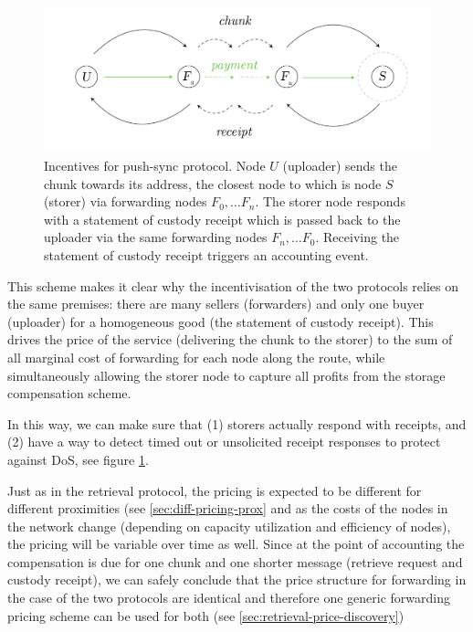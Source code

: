 \begin{figure}[htbp]
\centering
\includegraphics[width=\textwidth]{fig/push-payment.pdf}
\caption[Incentives for push-sync protocol \statusgreen]{Incentives for push-sync protocol. Node $U$ (uploader) sends the chunk towards its address, the closest node to which is node $S$ (storer) via forwarding nodes $F_0, \ldots F_n$. The storer node responds with a statement of custody receipt which is passed back to the uploader via the same forwarding nodes $F_n, \ldots F_0$. Receiving the statement of custody receipt triggers an accounting event.}
\label{fig:syncing-swap}
\end{figure}

This scheme makes it clear why the incentivisation of the two protocols relies on the same premises: there are many sellers (forwarders) and only one buyer (uploader) for a homogeneous good (the statement of custody receipt). This drives the price of the service (delivering the chunk to the storer) to the sum of all marginal cost of forwarding for each node along the route, while simultaneously allowing the storer node to capture all profits from the storage compensation scheme.

In this way, we can make sure that (1) storers actually respond with receipts, and (2) have a way to detect timed out or unsolicited receipt responses to protect against DoS, see figure \ref{fig:syncing-swap}.

Just as in the retrieval protocol, the pricing is expected to be different for different proximities (see \ref{sec:diff-pricing-prox} and as the costs of the nodes in the network change (depending on capacity utilization and efficiency of nodes), the pricing will be variable over time as well. Since at the point of accounting the compensation is due for one chunk and one shorter message (retrieve request and custody receipt), we can safely conclude that the price structure for forwarding in the case of the two protocols are identical and therefore one generic forwarding pricing scheme can be used for both (see  \ref{sec:retrieval-price-discovery}) 
 

